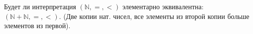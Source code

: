 Будет ли интерпретация $(\mathbb{N}, =, <)$ элементарно эквивалентна: $(\mathbb{N} + \mathbb{N}, =, <)$. (Две копии
нат. чисел, все элементы из второй копии больше элементов из первой).